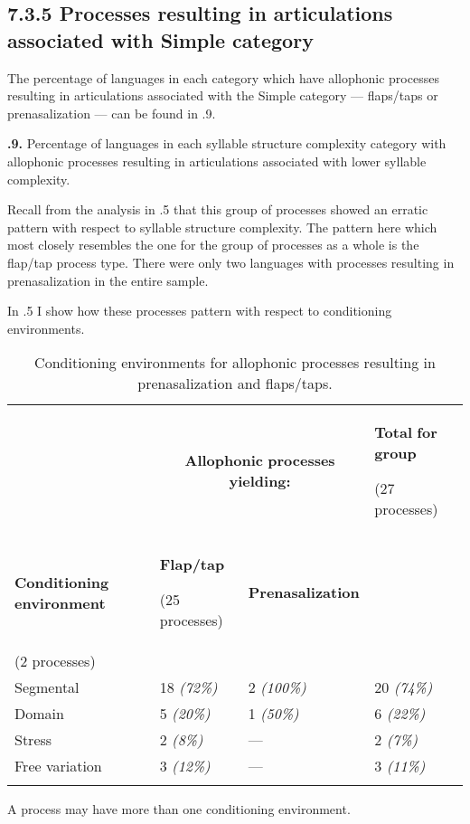 \subsection{7.3.5 Processes resulting in articulations associated with Simple category}

  The percentage of languages in each category which have allophonic processes resulting in articulations associated with the Simple category — flaps/taps or prenasalization — can be found in .9.





\textbf{.9.} Percentage of languages in each syllable structure complexity category with allophonic processes resulting in articulations associated with lower syllable complexity.



  Recall from the analysis in .5 that this group of processes showed an erratic pattern with respect to syllable structure complexity. The pattern here which most closely resembles the one for the group of processes as a whole is the flap/tap process type. There were only two languages with processes resulting in prenasalization in the entire sample.



  In .5 I show how these processes pattern with respect to conditioning environments.






\begin{table}
\begin{tabularx}{\textwidth}{XXXX}
\lsptoprule
 & \multicolumn{2}{c}{ \textbf{Allophonic} \textbf{processes} \textbf{yielding:}} & { \textbf{Total} \textbf{for} \textbf{group}}

 (27 processes)\\
 \textbf{Conditioning} \textbf{environment} & { \textbf{Flap/tap}}

 (25 processes) & \textbf{Prenasalization}\\
(2 processes) & \\
 Segmental & 18 \textit{(72\%)} & 2 \textit{(100\%)} & 20 \textit{(74\%)}\\
 Domain & 5 \textit{(20\%)} & 1 \textit{(50\%)} & 6 \textit{(22\%)}\\
 Stress & 2 \textit{(8\%)} & — & 2 \textit{(7\%)}\\
 Free variation & 3 \textit{(12\%)} & — & 3 \textit{(11\%)}\\
\lspbottomrule
\end{tabularx}
\caption{\label{7.5}Conditioning environments for allophonic processes resulting in prenasalization and flaps/taps.}A process may have more than one conditioning environment.
\end{table}




